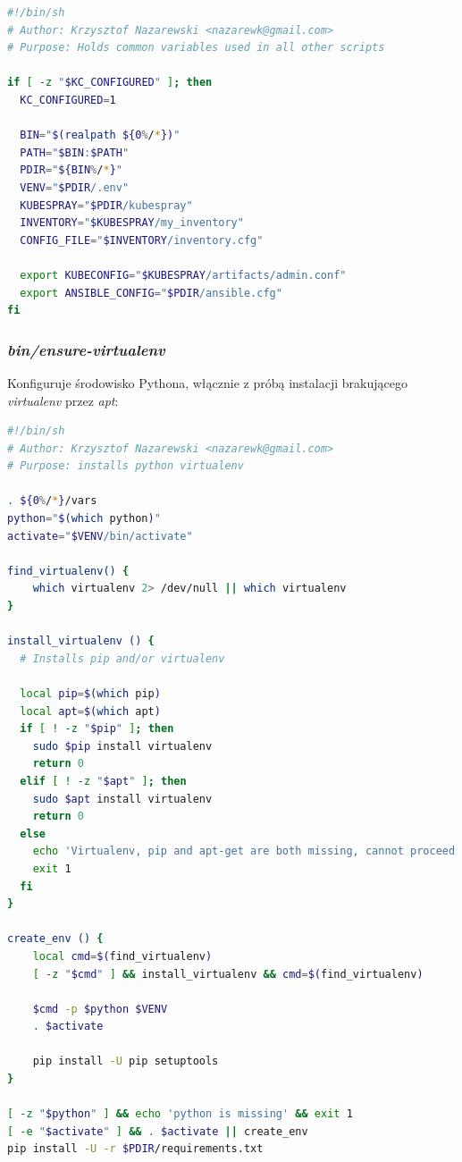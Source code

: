 \documentclass[a4paper,12pt,twoside,openany]{report}
\begin{document}
\begin{lstlisting}[language=bash]
#!/bin/sh
# Author: Krzysztof Nazarewski <nazarewk@gmail.com>
# Purpose: Holds common variables used in all other scripts

if [ -z "$KC_CONFIGURED" ]; then
  KC_CONFIGURED=1

  BIN="$(realpath ${0%/*})"
  PATH="$BIN:$PATH"
  PDIR="${BIN%/*}"
  VENV="$PDIR/.env"
  KUBESPRAY="$PDIR/kubespray"
  INVENTORY="$KUBESPRAY/my_inventory"
  CONFIG_FILE="$INVENTORY/inventory.cfg"

  export KUBECONFIG="$KUBESPRAY/artifacts/admin.conf"
  export ANSIBLE_CONFIG="$PDIR/ansible.cfg"
fi
\end{lstlisting}

\newpage

\hypertarget{binensure-virtualenv}{%
\subsubsection{\texorpdfstring{\emph{bin/ensure-virtualenv}}{bin/ensure-virtualenv}}\label{binensure-virtualenv}}

Konfiguruje środowisko Pythona, włącznie z próbą instalacji brakującego
\emph{virtualenv} przez \emph{apt}:

\begin{lstlisting}[language=bash]
#!/bin/sh
# Author: Krzysztof Nazarewski <nazarewk@gmail.com>
# Purpose: installs python virtualenv

. ${0%/*}/vars
python="$(which python)"
activate="$VENV/bin/activate"

find_virtualenv() {
    which virtualenv 2> /dev/null || which virtualenv
}

install_virtualenv () {
  # Installs pip and/or virtualenv

  local pip=$(which pip)
  local apt=$(which apt)
  if [ ! -z "$pip" ]; then
    sudo $pip install virtualenv
    return 0
  elif [ ! -z "$apt" ]; then
    sudo $apt install virtualenv
    return 0
  else
    echo 'Virtualenv, pip and apt-get are both missing, cannot proceed'
    exit 1
  fi
}

create_env () {
    local cmd=$(find_virtualenv)
    [ -z "$cmd" ] && install_virtualenv && cmd=$(find_virtualenv)

    $cmd -p $python $VENV
    . $activate

    pip install -U pip setuptools
}

[ -z "$python" ] && echo 'python is missing' && exit 1
[ -e "$activate" ] && . $activate || create_env
pip install -U -r $PDIR/requirements.txt
\end{lstlisting}
\end{document}
